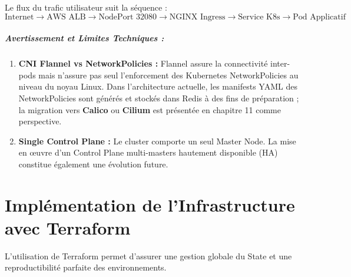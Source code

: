 \documentclass[12pt,a4paper]{report}
\begin{document}
Le flux du trafic utilisateur suit la séquence :
\[
\text{Internet} \longrightarrow \text{AWS ALB} \longrightarrow \text{NodePort 32080} \longrightarrow \text{NGINX Ingress} \longrightarrow \text{Service K8s} \longrightarrow \text{Pod Applicatif}
\]

\paragraph{Avertissement et Limites Techniques :}
\begin{enumerate}
    \item \textbf{CNI Flannel vs NetworkPolicies :} Flannel assure la connectivité inter-pods mais n'assure pas seul l'enforcement des Kubernetes NetworkPolicies au niveau du noyau Linux. Dans l'architecture actuelle, les manifests YAML des NetworkPolicies sont générés et stockés dans Redis à des fins de préparation ; la migration vers \textbf{Calico} ou \textbf{Cilium} est présentée en chapitre 11 comme perspective.
    \item \textbf{Single Control Plane :} Le cluster comporte un seul Master Node. La mise en œuvre d'un Control Plane multi-masters hautement disponible (HA) constitue également une évolution future.
\end{enumerate}

\chapter{Implémentation de l'Infrastructure avec Terraform}
L'utilisation de Terraform permet d'assurer une gestion globale du State et une reproductibilité parfaite des environnements.
\end{document}
